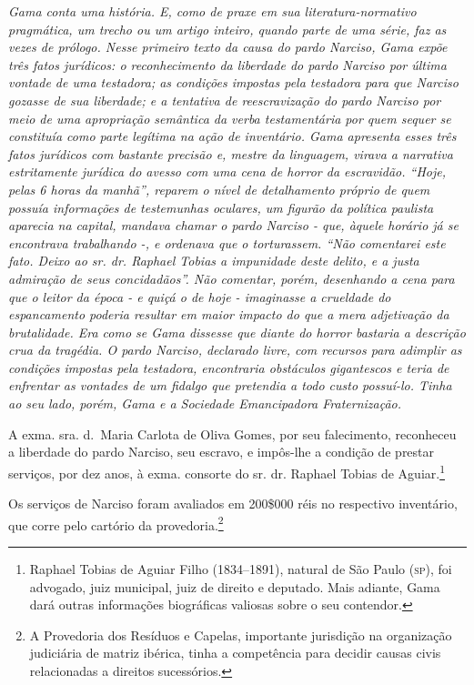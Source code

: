 \begin{didascalia}
\emph{Gama conta uma história. E, como de praxe em sua
literatura-normativo pragmática, um trecho ou um artigo inteiro, quando
parte de uma série, faz as vezes de prólogo. Nesse primeiro texto da
causa do pardo Narciso, Gama expõe três fatos jurídicos: o
reconhecimento da liberdade do pardo Narciso por última vontade de uma
testadora; as condições impostas pela testadora para que Narciso gozasse
de sua liberdade; e a tentativa de reescravização do pardo Narciso por
meio de uma apropriação semântica da verba testamentária por quem sequer
se constituía como parte legítima na ação de inventário. Gama apresenta
esses três fatos jurídicos com bastante precisão e, mestre da linguagem,
virava a narrativa estritamente jurídica do avesso com uma cena de
horror da escravidão. ``Hoje, pelas 6 horas da manhã'', reparem o nível de
detalhamento próprio de quem possuía informações de testemunhas
oculares, um figurão da política paulista aparecia na capital, mandava
chamar o pardo Narciso - que, àquele horário já se encontrava
trabalhando -, e ordenava que o torturassem. ``Não comentarei este fato.
Deixo ao sr. dr. Raphael Tobias a impunidade deste delito, e a justa
admiração de seus concidadãos''. Não comentar, porém, desenhando a cena
para que o leitor da época - e quiçá o de hoje - imaginasse a crueldade
do espancamento poderia resultar em maior impacto do que a mera
adjetivação da brutalidade. Era como se Gama dissesse que diante do
horror bastaria a descrição crua da tragédia. O pardo Narciso, declarado
livre, com recursos para adimplir as condições impostas pela testadora,
encontraria obstáculos gigantescos e teria de enfrentar as vontades de
um fidalgo que pretendia a todo custo possuí-lo. Tinha ao seu lado,
porém, Gama e a Sociedade Emancipadora Fraternização.}
\end{didascalia}


A exma. sra. d.~Maria Carlota de Oliva Gomes, por seu falecimento,
reconheceu a liberdade do pardo Narciso, seu escravo, e impôs-lhe a
condição de prestar serviços, por dez anos, à exma. consorte do sr. dr.
Raphael Tobias de Aguiar.\footnote{ Raphael Tobias de Aguiar Filho
  (1834--1891), natural de São Paulo (\textsc{sp}), foi advogado, juiz municipal,
  juiz de direito e deputado. Mais adiante, Gama dará outras informações
  biográficas valiosas sobre o seu contendor.}

Os serviços de Narciso foram avaliados em 200\$000 réis no respectivo
inventário, que corre pelo cartório da
provedoria.\footnote{ A Provedoria dos Resíduos e
  Capelas, importante jurisdição na organização judiciária de matriz
  ibérica, tinha a competência para decidir causas civis relacionadas a
  direitos sucessórios.}

